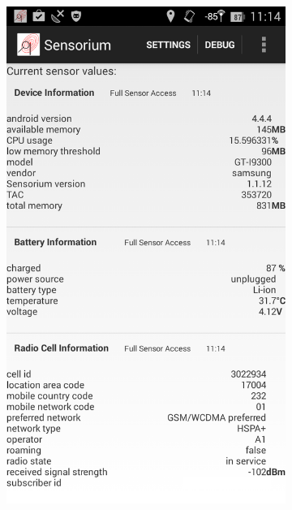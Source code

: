 \begin{figure}[htb]
        \centering
        \begin{subfigure}[b]{0.45\textwidth}
            \centering
			\includegraphics[width=\textwidth]{images/sensorium.png}
        \end{subfigure}%
        \hfill
        \begin{subfigure}[b]{0.45\textwidth}

\end{subfigure}
\end{figure}
